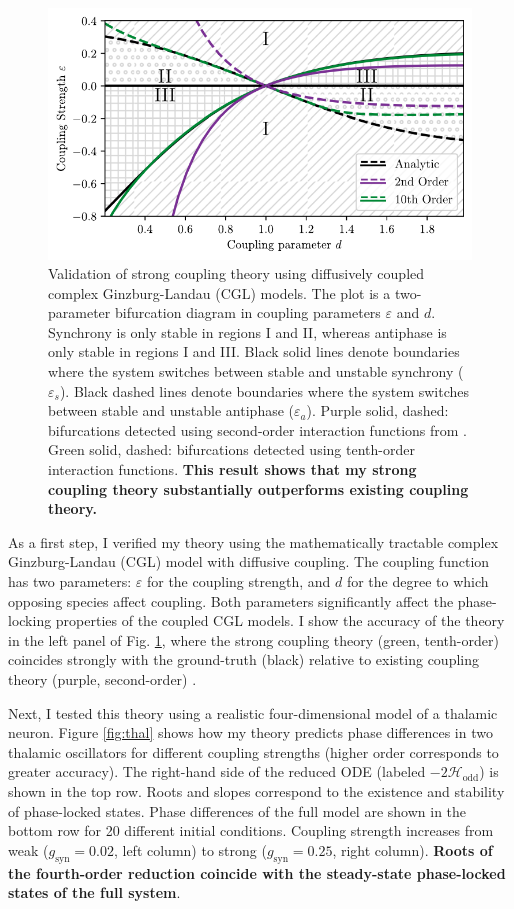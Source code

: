 \documentclass[a4paper,11pt]{article}
\newcommand{\ve}{\varepsilon}
\newcommand{\h}{\mathcal{H}}
\begin{document}
	\begin{figure}[ht!]
		\centering
		\includegraphics[width=.75\textwidth]{figures/cgl_2par_edited.pdf}
		\caption{Validation of strong coupling theory using diffusively coupled complex Ginzburg-Landau (CGL) models. The plot is a two-parameter bifurcation diagram in coupling parameters $\ve$ and $d$. Synchrony is only stable in regions I and II, whereas antiphase is only stable in regions I and III. Black solid lines denote boundaries where the system switches between stable and unstable synchrony ($\ve_s$). Black dashed lines denote boundaries where the system switches between stable and unstable antiphase ($\ve_a$). Purple solid, dashed: bifurcations detected using second-order interaction functions from \cite{wilson2019phase}. Green solid, dashed: bifurcations detected using tenth-order interaction functions. \textbf{This result shows that my strong coupling theory substantially outperforms existing coupling theory.}}\label{fig:cgl}
	\end{figure}
	
	As a first step, I verified my theory using the mathematically tractable complex Ginzburg-Landau (CGL) model with diffusive coupling. The coupling function has two parameters: $\ve$ for the coupling strength, and $d$ for the degree to which opposing species affect coupling. Both parameters significantly affect the phase-locking properties of the coupled CGL models. I show the accuracy of the theory in the left panel of Fig. \ref{fig:cgl}, where the strong coupling theory (green, tenth-order) coincides strongly with the ground-truth (black) relative to existing coupling theory (purple, second-order) \cite{wilson2019phase}. 
	
	Next, I tested this theory using a realistic four-dimensional model of a thalamic neuron. Figure \ref{fig:thal} shows how my theory predicts phase differences in two thalamic oscillators for different coupling strengths (higher order corresponds to greater accuracy). The right-hand side of the reduced ODE (labeled $-2\h_{\text{odd}}$) is shown in the top row. Roots and slopes correspond to the existence and stability of phase-locked states. Phase differences of the full model are shown in the bottom row for 20 different initial conditions. Coupling strength increases from weak ($g_\text{syn}=0.02$, left column) to strong ($g_\text{syn}=0.25$, right column). \textbf{Roots of the fourth-order reduction coincide with the steady-state phase-locked states of the full system}.
	
\end{document}
